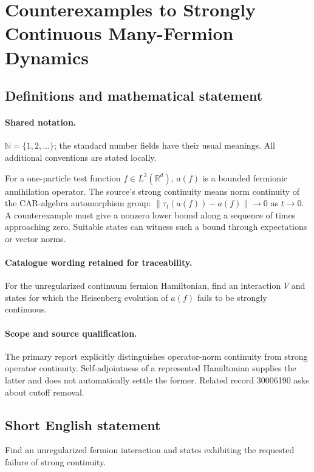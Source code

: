\documentclass[11pt]{article}
\begin{document}
\section{Counterexamples to Strongly Continuous Many-Fermion Dynamics}\label{statement}

\subsection{Definitions and mathematical statement}

\paragraph{Shared notation.}$\mathbb N=\{1,2,\ldots\}$; the standard number fields have their usual meanings. All additional conventions are stated locally.


For a one-particle test function $f\in L^2(\mathbb R^d)$, $a(f)$ is a bounded fermionic annihilation operator. The source's strong continuity means norm continuity of the CAR-algebra automorphism group: $\|\tau_t(a(f))-a(f)\|\to0$ as $t\to0$. A counterexample must give a nonzero lower bound along a sequence of times approaching zero. Suitable states can witness such a bound through expectations or vector norms.

\paragraph{Catalogue wording retained for traceability.}
For the unregularized continuum fermion Hamiltonian, find an interaction $V$ and states for which the Heisenberg evolution of $a(f)$ fails to be strongly continuous.

\paragraph{Scope and source qualification.}The primary report explicitly distinguishes operator-norm continuity from strong operator continuity. Self-adjointness of a represented Hamiltonian supplies the latter and does not automatically settle the former. Related record 30006190 asks about cutoff removal.
\subsection{Short English statement}
Find an unregularized fermion interaction and states exhibiting the requested failure of strong continuity.
\end{document}
